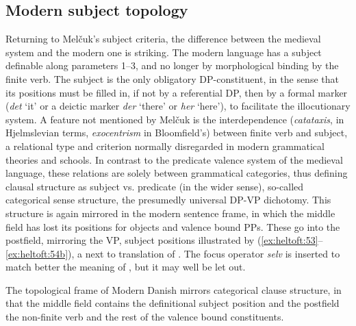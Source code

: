 \documentclass[output=paper]{langscibook}
\begin{document}
\subsection{Modern subject topology} \label{heltoft:5.1}
Returning to Melčuk's subject criteria, the difference between the medieval system and the modern one is striking. The modern language has a subject definable along parameters 1--3, and no longer by morphological binding by the finite verb. The subject is the only obligatory DP-constituent, in the sense that its positions must be filled in, if not by a referential DP, then by a formal marker (\textit{det} ‘it' or a deictic marker \textit{der} ‘there' or \textit{her} ‘here'), to facilitate the illocutionary system. A feature not mentioned by Melčuk is the interdependence (\textit{catataxis}, in Hjelmslevian terms, \textit{exocentrism} in Bloomfield's) between finite verb and subject, a relational type and criterion normally disregarded in modern grammatical theories and schools. In contrast to the predicate valence system of the medieval language, these relations are solely between grammatical categories, thus defining clausal structure as subject vs. predicate (in the wider sense), so-called categorical sense structure, the presumedly universal DP-VP dichotomy. This structure is again mirrored in the modern sentence frame, in which the middle field has lost its positions for objects and valence bound PPs. These go into the postfield, mirroring the VP, subject positions illustrated by (\ref{ex:heltoft:53}--\ref{ex:heltoft:54b}), a next to translation of . The focus operator \textit{selv} is inserted to match better the meaning of , but it may well be let out.

\begin{exe}

\end{exe}  

The topological frame of Modern Danish \citep{Diderichsen1946,Heltoft1992} mirrors categorical clause structure, in that the middle field contains the definitional subject position and the postfield the non-finite verb and the rest of the valence bound constituents.
\end{document}
